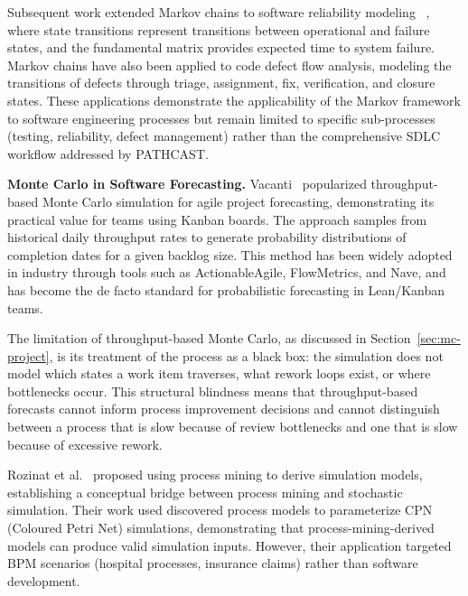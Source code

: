 Subsequent work extended Markov chains to software reliability modeling ~\cite{WhittakerRekabThomason2000}, where state transitions represent transitions between operational and failure states, and the fundamental matrix provides expected time to
system failure. Markov chains have also been applied to code defect
flow analysis, modeling the transitions of defects through triage,
assignment, fix, verification, and closure states. These applications
demonstrate the applicability of the Markov framework to software
engineering processes but remain limited to specific sub-processes
(testing, reliability, defect management) rather than the comprehensive
SDLC workflow addressed by PATHCAST.

\textbf{Monte Carlo in Software Forecasting.}
Vacanti~\cite{vacanti2015} popularized throughput-based Monte
Carlo simulation for agile project forecasting, demonstrating its
practical value for teams using Kanban boards. The approach samples from
historical daily throughput rates to generate probability distributions
of completion dates for a given backlog size. This method has been widely
adopted in industry through tools such as ActionableAgile, FlowMetrics,
and Nave, and has become the de facto standard for probabilistic
forecasting in Lean/Kanban teams.

The limitation of throughput-based Monte Carlo, as discussed in
Section~\ref{sec:mc-project}, is its treatment of the process as a black
box: the simulation does not model which states a work item traverses,
what rework loops exist, or where bottlenecks occur. This structural
blindness means that throughput-based forecasts cannot inform process
improvement decisions and cannot distinguish between a process that is
slow because of review bottlenecks and one that is slow because of
excessive rework.

Rozinat et al.~\cite{Rozinat2009SimulationModelsProcessMining} proposed using process
mining to derive simulation models, establishing a conceptual bridge
between process mining and stochastic simulation. Their work used
discovered process models to parameterize CPN (Coloured Petri Net)
simulations, demonstrating that process-mining-derived models can produce
valid simulation inputs. However, their application targeted BPM
scenarios (hospital processes, insurance claims) rather than software
development.

